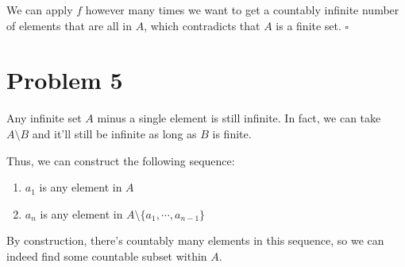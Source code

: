 \documentclass[12pt]{article}
\begin{document}
We can apply $f$ however many times we want to get a countably
infinite number of elements that are all in $A$,
which contradicts that $A$ is a finite set. $\square$

\section{Problem 5}

Any infinite set $A$ minus a single element is still infinite.
In fact, we can take $A \setminus B$ and it'll still be infinite
as long as $B$ is finite.

Thus, we can construct the following sequence:
\begin{enumerate}[nolistsep]
  \item $a_1$ is any element in $A$
  \item $a_n$ is any element in $A \setminus \{a_1, \cdots, a_{n-1}\}$
\end{enumerate}
By construction, there's countably many elements in this sequence,
so we can indeed find some countable subset within $A$.
\end{document}
